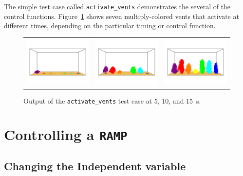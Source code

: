 \documentclass[11pt]{book}
\newcommand{\ct}{\tt\small}
\begin{document}
The simple test case called {\ct activate\_vents} demonstrates the several of the control functions. Figure~\ref{activate_vents} shows seven
multiply-colored vents that activate at different times, depending on the particular timing or control function.
\begin{figure}[ht]
\begin{tabular*}{\textwidth}{lll}
\includegraphics[width=2.05in]{SCRIPT_FIGURES/activate_vents_5} &
\includegraphics[width=2.05in]{SCRIPT_FIGURES/activate_vents_10} &
\includegraphics[width=2.05in]{SCRIPT_FIGURES/activate_vents_15}
\end{tabular*}
\caption[Snapshots of the {\ct activate\_vents} test case]{Output of the {\ct activate\_vents} test case at 5, 10, and 15~s.}
\label{activate_vents}
\end{figure}




\section{Controlling a \texorpdfstring{{\tt RAMP}}{RAMP}}

\subsection{Changing the Independent variable}
\label{info:RAMPDEVC}
\end{document}

